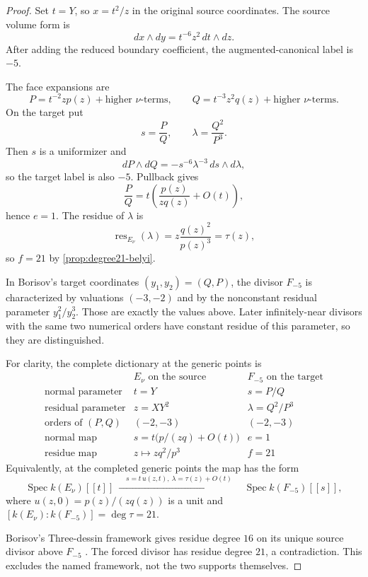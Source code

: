 \begin{proof}
Set \(t=Y\), so \(x=t^2/z\) in the original source coordinates.  The source
volume form is
\[
dx\wedge dy=t^{-6}z^2\,dt\wedge dz.
\]
After adding the reduced boundary coefficient, the augmented-canonical label
is \(-5\).

The face expansions are
\[
P=t^{-2}zp(z)+\text{higher \(\nu\)-terms},\qquad
Q=t^{-3}z^2q(z)+\text{higher \(\nu\)-terms}.
\]
On the target put
\[
s=\frac P Q,\qquad \lambda=\frac{Q^2}{P^3}.
\]
Then \(s\) is a uniformizer and
\[
dP\wedge dQ=-s^{-6}\lambda^{-3}\,ds\wedge d\lambda,
\]
so the target label is also \(-5\).  Pullback gives
\[
\frac P Q
=t\left(\frac{p(z)}{zq(z)}+O(t)\right),
\]
hence \(e=1\).  The residue of \(\lambda\) is
\[
\operatorname{res}_{E_\nu}(\lambda)
=z\frac{q(z)^2}{p(z)^3}=\tau(z),
\]
so \(f=21\) by \cref{prop:degree21-belyi}.

In Borisov's target coordinates \((y_1,y_2)=(Q,P)\), the divisor
\(F_{-5}\) is characterized by valuations \((-3,-2)\) and by the
nonconstant residual parameter \(y_1^2/y_2^3\).  Those are exactly the
values above.  Later infinitely-near divisors with the same two numerical
orders have constant residue of this parameter, so they are distinguished.

For clarity, the complete dictionary at the generic points is
\[
\begin{array}{c|c|c}
 & E_\nu\text{ on the source} & F_{-5}\text{ on the target}\\ \hline
\text{normal parameter} & t=Y & s=P/Q\\
\text{residual parameter} & z=XY^2 & \lambda=Q^2/P^3\\
\text{orders of }(P,Q) & (-2,-3) & (-2,-3)\\
\text{normal map} & s=t\bigl(p/(zq)+O(t)\bigr) & e=1\\
\text{residue map} & z\longmapsto zq^2/p^3 & f=21
\end{array}
\]
Equivalently, at the completed generic points the map has the form
\[
\operatorname{Spec}k(E_\nu)[[t]]
\ \xrightarrow{\quad s=t\,u(z,t),\ \lambda=\tau(z)+O(t)\quad}\
\operatorname{Spec}k(F_{-5})[[s]],
\]
where \(u(z,0)=p(z)/(zq(z))\) is a unit and
\([k(E_\nu):k(F_{-5})]=\deg\tau=21\).

Borisov's Three-dessin framework gives residue degree \(16\) on its unique
source divisor above \(F_{-5}\) \cite{borisov2020frameworks}.  The forced
divisor has residue degree
\(21\), a contradiction.  This excludes the named framework, not the two
supports themselves.
\end{proof}

